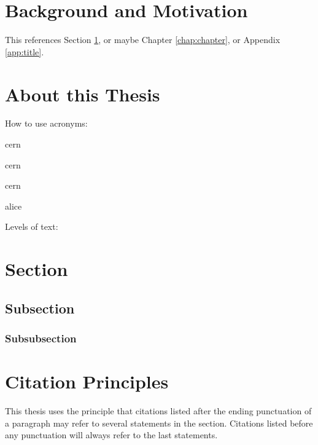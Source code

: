 
\section{Background and Motivation}
\label{sec:background} %

This references Section \ref{sec:background}, or maybe Chapter \ref{chap:chapter}, or Appendix \ref{app:title}.

\section{About this Thesis}
\label{sec:about_thesis}

How to use acronyms:

\acrfull{cern}

\acrlong{cern}

\acrshort{cern}

\acrfull{alice}

Levels of text:

\section{Section}
\label{sec:section}

\lipsum[2][1-4]

\subsection{Subsection}
\label{sec:subsection}

\lipsum[2][1-4]

\subsubsection{Subsubsection}

\lipsum[2][1-4]

\section{Citation Principles}
\label{sec:citation-principles}
This thesis uses the principle that citations listed after the ending punctuation of a paragraph may refer to several statements in the section. 
Citations listed before any punctuation will always refer to the last statements.
